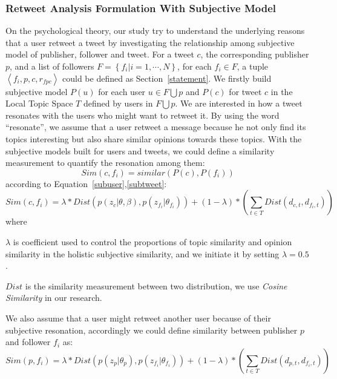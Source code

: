 \documentclass[preprint,times]{elsarticle}
\begin{document}
\subsubsection{Retweet Analysis Formulation With Subjective Model}
\label{formulation}
On the psychological theory, our study try to understand the underlying reasons that a user retweet a tweet by investigating the relationship among subjective model of publisher, follower and tweet. For a tweet $ c $, the corresponding publisher $ p $, and a list of followers $ F= \left\lbrace f_{i} \vert i=1, \cdots, N \right\rbrace  $, for each $ f_{i} \in F $, a tuple $ \left\langle f_{i}, p, c, r_{fpc} \right\rangle  $  could be defined as Section~\ref{statement}.
We firstly build subjective model $ P\left( u \right)  $ for each user $ u \in F \bigcup p $ and $ P\left( c \right)  $ for tweet $ c $ in the Local Topic Space $ T $ defined by users in $ F \bigcup p $. 
We are interested in how a tweet resonates with the users who might want to retweet it.
By using the word ``resonate'', we assume that a user retweet a message because he not only find its topics interesting but also share similar opinions towards these topics.
With the subjective models built for users and tweets, we could define a similarity measurement to quantify the resonation among them:\\
\begin{equation}
Sim\left( c,f_{i} \right) = similar\left( P\left( c \right), P\left( f_{i} \right) \right)
\end{equation}
according to Equation~\ref{subuser},\ref{subtweet}:
\begin{equation}
\label{tweetfollower}
Sim\left( c,f_{i} \right) = \lambda \ast Dist\left( p\left( z_{c} \vert \theta, \beta \right), p\left( z_{f_{i}} \vert \theta_{f_{i}} \right) \right) 
+\left(1-\lambda \right) \ast \left( \sum_{t \in T} Dist \left( d_{c,t}, d_{f_{i}, t} \right)  \right)
\end{equation}
where 
\begin{itemize*}
\item $ \lambda $ is coefficient used to control the proportions of topic similarity and opinion similarity in the holistic subjective similarity, and we initiate it by setting $ \lambda =0.5 $. 
\item $ Dist $ is the similarity measurement between two distribution, we use \emph{Cosine Similarity } in our research.
\end{itemize*}
We also assume that a user might retweet another user because of their subjective resonation, accordingly we could define similarity between publisher $ p $ and follower $ f_{i} $ as:
\begin{equation}
\label{pubfollower}
Sim\left( p,f_{i} \right) = \lambda \ast Dist\left( p\left( z_{p} \vert \theta_{p} \right), p\left( z_{f_{i}} \vert \theta_{f_{i}} \right) \right) 
+\left(1-\lambda \right) \ast \left( \sum_{t \in T} Dist \left( d_{p,t}, d_{f_{i}, t} \right)  \right)
\end{equation}
\end{document}
